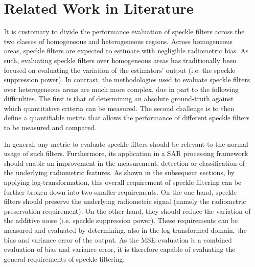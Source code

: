 \documentclass[journal]{IEEEtran}
\begin{document}
\section{Related Work in Literature}
\label{sec:lit_review}

It is customary to divide the performance evaluation of speckle filters across the two classes of 
	homogeneous and heterogeneous regions.
Across homogeneous areas, speckle filters are expected to estimate with negligible radiometric bias.
As such, evaluating speckle filters over homogeneous areas has traditionally been focused on evaluating the variation of the estimators'
	output (i.e. the speckle suppression power).
In contrast, the methodologies used to evaluate speckle filters over heterogeneous areas are much more complex, 
	due in part to the following difficulties.
The first is that of determining an absolute ground-truth against which quantitative criteria can be measured.
The second challenge is to then define a quantifiable metric that allows the performance of different speckle filters 
	to be measured and compared.

In general, any metric to evaluate speckle filters should be relevant to the normal usage of such filters.
Furthermore, its application in a SAR processing framework should enable an improvement in the measurement, 
	detection or classification of the underlying radiometric features.
As shown in the subsequent sections, by applying log-transformation, 
	this overall requirement of speckle filtering can be further broken down into two smaller requirements.
On the one hand, speckle filters should preserve the underlying radiometric signal (namely the radiometric 
	preservation requirement).
On the other hand, they should reduce the variation of the additive noise (i.e. speckle suppression power).
These requirements can be measured and evaluated by determining, also in the log-transformed domain, the bias 
	and variance error of the output.
As the MSE evaluation is a combined evaluation of bias and variance error, it is therefore capable of evaluating 
	the general requirements of speckle filtering.
\end{document}

